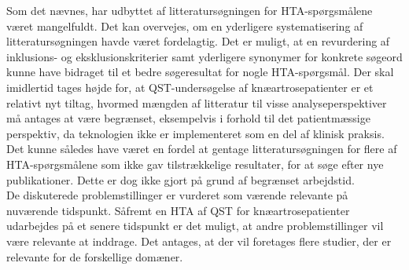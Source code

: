 Som det nævnes, har udbyttet af litteratursøgningen for HTA-spørgsmålene været mangelfuldt. Det kan overvejes, om en yderligere systematisering af litteratursøgningen havde været fordelagtig. Det er muligt, at en revurdering af inklusions- og eksklusionskriterier samt yderligere synonymer for konkrete søgeord kunne have bidraget til et bedre søgeresultat for nogle HTA-spørgsmål. Der skal imidlertid tages højde for, at QST-undersøgelse af knæartrosepatienter er et relativt nyt tiltag, hvormed mængden af litteratur til visse analyseperspektiver må antages at være begrænset, eksempelvis i forhold til det patientmæssige perspektiv, da teknologien ikke er implementeret som en del af klinisk praksis. Det kunne således have været en fordel at gentage litteratursøgningen for flere af HTA-spørgsmålene som ikke gav tilstrækkelige resultater, for at søge efter nye publikationer. Dette er dog ikke gjort på grund af begrænset arbejdstid.\\
De diskuterede problemstillinger er vurderet som værende relevante på nuværende tidspunkt. Såfremt en HTA af QST for knæartrosepatienter udarbejdes på et senere tidspunkt er det muligt, at andre problemstillinger vil være relevante at inddrage. Det antages, at der vil foretages flere studier, der er relevante for de forskellige domæner.  
